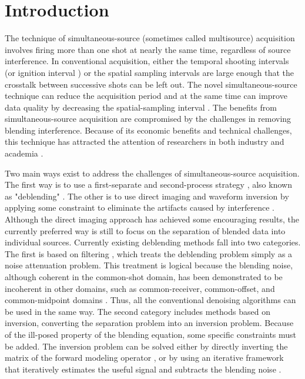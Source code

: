 \section{Introduction}

The technique of simultaneous-source (sometimes called multisource) acquisition involves firing more than one shot at nearly the same time, regardless of source interference. In conventional acquisition, either the temporal shooting intervals (or ignition interval \cite[]{wapenaar20121}) or the spatial sampling intervals are large enough that the crosstalk between successive shots can be left out. The novel simultaneous-source technique can reduce the acquisition period and at the same time can improve data quality by decreasing the spatial-sampling interval \cite[]{berk}. The benefits from simultaneous-source acquisition are compromised by the challenges in removing blending interference.  Because of its economic benefits and technical challenges, this technique has attracted the attention of researchers in both industry and academia \cite[]{moore2008,araz2011,mediandeblend}. 

Two main ways exist to address the challenges of simultaneous-source acquisition. The first way is to use a first-separate and second-process strategy \cite[]{spitz2008,araz2011,abma,yangkang20131}, also known as "deblending" \cite[]{pana1}. The other is to use direct imaging and waveform inversion by applying some constraint to eliminate the artifacts caused by interference \cite[]{yaxun2009,zhiyong2010,daiwei2011,daiwei2012}. Although the direct imaging approach has achieved some encouraging results, the currently preferred way is still to focus on the separation of blended data into individual sources. Currently existing deblending methods fall into two categories. The first is based on filtering \cite[]{gary,mediandeblend}, which treats the deblending problem simply as a noise attenuation problem. This treatment is logical because the blending noise, although coherent in the common-shot domain, has been demonstrated to be incoherent in other domains, such as common-receiver, common-offset, and common-midpoint domains \cite[]{beasley2,berk}. Thus, all the conventional denoising algorithms can be used in the same way. The second category includes methods based on inversion, converting the separation problem into an inversion problem. Because of the ill-posed property of the blending equation, some specific constraints must be added. The inversion problem can be solved either by directly inverting the matrix of the forward modeling operator \cite[]{wapenaar20121,wapenaar20122}, or by using an iterative framework that iteratively estimates the useful signal and subtracts the  blending noise \cite[]{araz2011,araz2012,pana2,yangkang20131}. 


